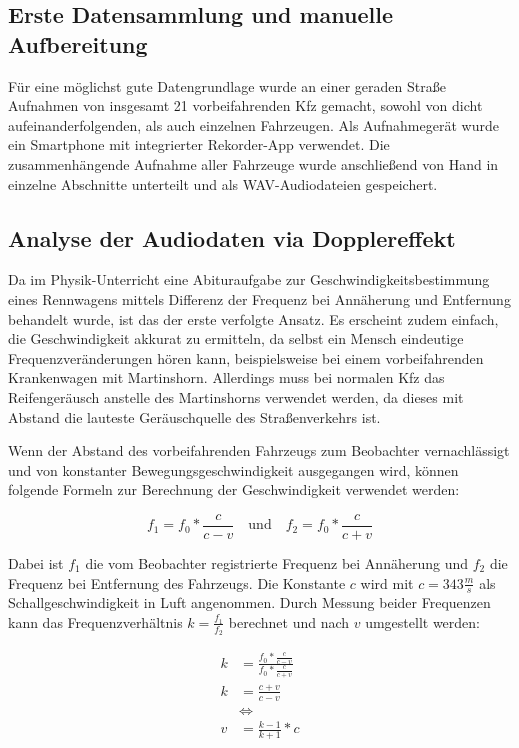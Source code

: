 \subsection{Erste Datensammlung und manuelle Aufbereitung}
Für eine möglichst gute Datengrundlage wurde an einer geraden Straße Aufnahmen von insgesamt 21 vorbeifahrenden Kfz gemacht, sowohl von dicht aufeinanderfolgenden, als auch einzelnen Fahrzeugen. Als Aufnahmegerät wurde ein Smartphone mit integrierter Rekorder-App verwendet. Die zusammenhängende Aufnahme aller Fahrzeuge wurde anschließend von Hand in einzelne Abschnitte unterteilt und als WAV-Audiodateien gespeichert.  %

\subsection{Analyse der Audiodaten via Dopplereffekt}
Da im Phy\-sik-Unter\-richt eine Abituraufgabe zur Geschwindigkeitsbestimmung eines Rennwagens mittels Differenz der Frequenz bei Annäherung und Entfernung behandelt wurde, ist das der erste verfolgte Ansatz. Es erscheint zudem einfach, die Geschwindigkeit akkurat zu ermitteln, da selbst ein Mensch eindeutige Frequenzveränderungen hören kann, beispielsweise bei einem vorbeifahrenden Krankenwagen mit Martinshorn. Allerdings muss bei normalen Kfz das Reifengeräusch anstelle des Martinshorns verwendet werden, da dieses mit Abstand die lauteste Geräuschquelle des Straßenverkehrs ist.

Wenn der Abstand des vorbeifahrenden Fahrzeugs zum Beobachter vernachlässigt und von konstanter Bewegungsgeschwindigkeit ausgegangen wird, können folgende Formeln zur Berechnung der Geschwindigkeit verwendet werden:

\[
    f_{1} = f_{0} * \frac{c}{c - v}
    \quad\text{und}\quad
    f_{2} = f_{0} * \frac{c}{c + v}
\]

Dabei ist \(f_{1}\) die vom Beobachter registrierte Frequenz bei Annäherung und \(f_{2}\) die Frequenz bei Entfernung des Fahrzeugs. Die Konstante \(c\) wird mit \(c = 343\frac{m}{s}\) als Schallgeschwindigkeit in Luft angenommen. Durch Messung beider Frequenzen kann das Frequenzverhältnis \(k = \frac{f_{1}}{f_{2}}\) berechnet und nach \(v\) umgestellt werden:

\begin{equation*}
    \begin{split}
        k & = \frac{f_{0} * \frac{c}{c - v}}{f_{0} * \frac{c}{c + v}} \\
        k & = \frac{c + v}{c - v} \\
        & \Leftrightarrow \\
        v & = \frac{k - 1}{k + 1} * c
    \end{split}
\end{equation*}

